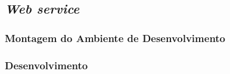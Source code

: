 			\subsection{\textit{Web service}}	
				
	
						\subsubsection{Montagem do Ambiente de Desenvolvimento}
							
	
						\subsubsection{Desenvolvimento}
							
